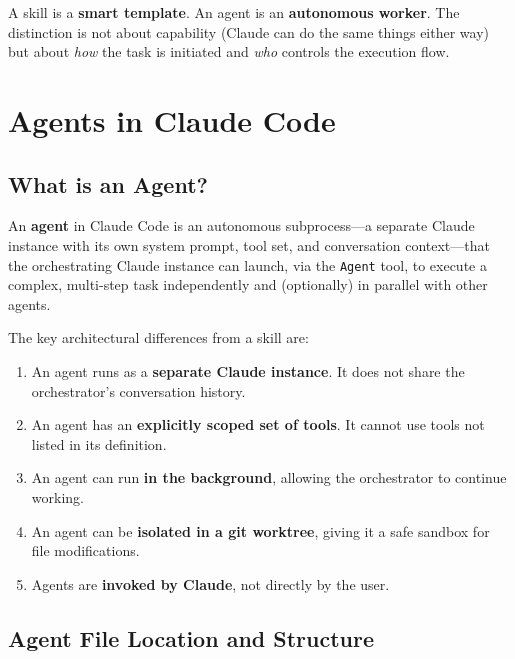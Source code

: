 \documentclass[11pt,letterpaper]{article}
\begin{document}
\begin{notebox}
A skill is a \textbf{smart template}. An agent is an \textbf{autonomous worker}. The distinction is not about capability (Claude can do the same things either way) but about \emph{how} the task is initiated and \emph{who} controls the execution flow.
\end{notebox}

\section{Agents in Claude Code}

\subsection{What is an Agent?}

\begin{definitionbox}[title=Agent (Claude Code)]
An \textbf{agent} in Claude Code is an autonomous subprocess---a separate Claude instance with its own system prompt, tool set, and conversation context---that the orchestrating Claude instance can launch, via the \texttt{Agent} tool, to execute a complex, multi-step task independently and (optionally) in parallel with other agents.
\end{definitionbox}

The key architectural differences from a skill are:
\begin{enumerate}[leftmargin=*]
    \item An agent runs as a \textbf{separate Claude instance}. It does not share the orchestrator's conversation history.
    \item An agent has an \textbf{explicitly scoped set of tools}. It cannot use tools not listed in its definition.
    \item An agent can run \textbf{in the background}, allowing the orchestrator to continue working.
    \item An agent can be \textbf{isolated in a git worktree}, giving it a safe sandbox for file modifications.
    \item Agents are \textbf{invoked by Claude}, not directly by the user.
\end{enumerate}

\subsection{Agent File Location and Structure}
\end{document}

